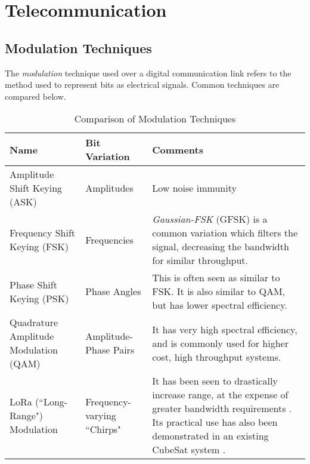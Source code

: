 \section{Telecommunication}\label{sec:telecommunication_theory}

\subsection{Modulation Techniques}
The \textit{modulation} technique used over a digital communication link refers to the method used to represent bits as electrical signals. Common techniques are compared below.

\begin{table}[!htb]
  \centering
  \renewcommand{\arraystretch}{1.2}
  \hspace*{-0.5cm}
  \begin{tabular}{ |p{3cm}|p{2cm}|p{11cm}| }
  \hline
  \textbf{Name}                & \textbf{Bit Variation}    & \textbf{Comments} \\ \hline
   Amplitude Shift Keying (ASK)
   & Amplitudes
   & Low noise immunity
   \\ \hline
   Frequency Shift Keying (FSK)
   & Frequencies
   & \textit{Gaussian-FSK} (GFSK) is a common variation which filters the signal, decreasing the bandwidth for similar throughput.
   \\ \hline
   Phase Shift \mbox{Keying} (PSK)
   & Phase \mbox{Angles}
   & This is often seen as similar to FSK. It is also similar to QAM, but has lower spectral efficiency.
   \\ \hline
   Quadrature Amplitude Modulation (QAM)
   & Amplitude-Phase Pairs
   & It has very high spectral efficiency, and is commonly used for higher cost, high throughput systems.
   \\ \hline
   LoRa (``Long-Range") \mbox{Modulation}
   & Frequency-varying ``Chirps"
   & It has been seen to drastically increase range, at the expense of greater bandwidth requirements \cite{datasheet-SX1278}. Its practical use has also been demonstrated in an existing CubeSat system \cite{design-FOSSASATLink}.
   \\ \hline
  \end{tabular}
  \caption{Comparison of Modulation Techniques}
  \label{tab:modulationTechniques}
\end{table}
\vspace*{-\baselineskip}

